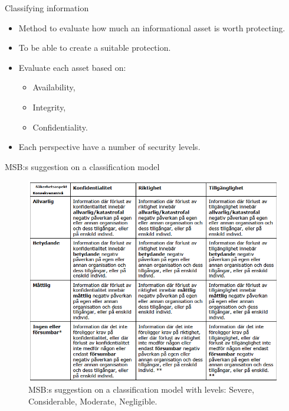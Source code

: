 \documentclass{beamer}
\begin{document}
\begin{frame}{Classifying information}
  \begin{itemize}
    \item Method to evaluate how much an informational asset is worth
      protecting.

    \item To be able to create a suitable protection.

    \item Evaluate each asset based on:
      \begin{itemize}
        \item Availability,
        \item Integrity,
        \item Confidentiality.
      \end{itemize}

    \item Each perspective have a number of security levels.

  \end{itemize}
\end{frame}

\begin{frame}{MSB:s suggestion on a classification model}
  \begin{figure}
    \includegraphics[height=0.7\textheight]{msb-klassificering.png}
    \caption{MSB:s suggestion on a classification model with levels: Severe, Considerable,
      Moderate, Negligible.}
  \end{figure}
\end{frame}
\end{document}
